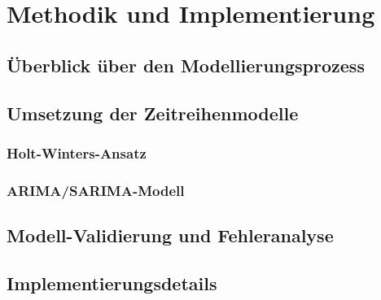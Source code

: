 \newpage

\section{Methodik und Implementierung}
\label{sec:methodik}

\subsection{Überblick über den Modellierungsprozess}
\label{subsec:prozess}

\subsection{Umsetzung der Zeitreihenmodelle}
\label{subsec:umsetzung}

\subsubsection{Holt-Winters-Ansatz}
\label{subsubsec:holtwinters}

\subsubsection{ARIMA/SARIMA-Modell}
\label{subsubsec:arima-sarima}

\subsection{Modell-Validierung und Fehleranalyse}
\label{subsec:validierung}

\subsection{Implementierungsdetails}
\label{subsec:implementierung}